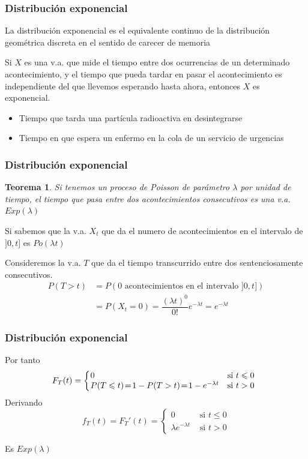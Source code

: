 \documentclass[handout]{beamer}\usepackage[]{graphicx}\usepackage[]{color}
\renewcommand{\leq}{\leqslant}
\theoremstyle{plain}
\newtheorem{teorema}{Teorema}
\theoremstyle{definition}
\begin{document}
\begin{frame} 
\frametitle{Distribución exponencial}

La distribución exponencial es el equivalente continuo de la distribución geométrica discreta en el sentido de carecer de memoria
\medskip

Si $X$ es una v.a. que mide el tiempo entre dos ocurrencias de un determinado acontecimiento,
y  el tiempo  que pueda tardar en pasar el acontecimiento es independiente del que llevemos  esperando hasta ahora, entonces $X$ es exponencial.
\medskip

\begin{itemize}
\item Tiempo que tarda una partícula radioactiva en  desintegrarse

\item Tiempo en  que espera un enfermo en la cola  de un servicio de urgencias
\end{itemize}

\end{frame}

\begin{frame} 
\frametitle{Distribución exponencial}

\begin{teorema}
Si tenemos un proceso de Poisson de  parámetro $\lambda$ por unidad  de tiempo, el tiempo  que pasa entre dos acontecimientos consecutivos es una v.a. $Exp(\lambda)$
\end{teorema}

Si sabemos que la v.a. $X_t$ que da el numero de acontecimientos en el intervalo de  $]0,t]$ es  $Po(\lambda t)$
\medskip

Consideremos  la v.a. $T$ que da el tiempo transcurrido entre dos sentenciosamente consecutivos.
$$
\begin{array}{rl}
P(T>t) & = P(\mbox{0  acontecimientos en el intervalo }]0,t])\\
 & =P(X_t=0)=\dfrac{(\lambda t)^0}{0!} e^{-\lambda t}=e^{-\lambda t}
\end{array}
$$

\end{frame}

\begin{frame} 
\frametitle{Distribución exponencial}

Por tanto
$$
F_T(t) = \left\{
\begin{array}{ll}
\hspace*{-1ex}
0 & \mbox{si $t\leq 0$}\\
\hspace*{-1ex}
P(T\leq t)\!=\!1-P(T>t)\!=\! 1-e^{-\lambda t} & \mbox{si $t> 0$}
\end{array}\right.
$$
Derivando
$$
f_{T}(t)=F_T'(t)=
\left\{\begin{array}{ll}
          0 & \mbox{ si } t\leq 0\\
        \lambda e^{-\lambda t} & \mbox{ si }  t>0
         \end{array}\right.
$$

Es $Exp(\lambda)$

\end{frame}
\end{document}
